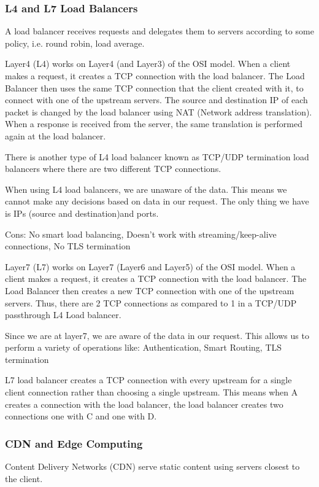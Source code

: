 \documentclass{article}
\begin{document}
    \subsubsection{L4 and L7 Load Balancers}
    A load balancer receives requests and delegates them to servers according to some policy, i.e. round robin, load average.
    
    Layer4 (L4) works on Layer4 (and Layer3) of the OSI model. When a client makes a request, it creates a TCP connection with the load balancer. The Load Balancer then uses the same TCP connection that the client created with it, to connect with one of the upstream servers. The source and destination IP of each packet is changed by the load balancer using NAT (Network address translation). When a response is received from the server, the same translation is performed again at the load balancer.
    
    There is another type of L4 load balancer known as TCP/UDP termination load balancers where there are two different TCP connections.
    
    When using L4 load balancers, we are unaware of the data. This means we cannot make any decisions based on data in our request. The only thing we have is IPs (source and destination)and ports.
    
    Cons: No smart load balancing, Doesn’t work with streaming/keep-alive connections, No TLS termination

    Layer7 (L7) works on Layer7 (Layer6 and Layer5) of the OSI model. When a client makes a request, it creates a TCP connection with the load balancer. The Load Balancer then creates a new TCP connection with one of the upstream servers. Thus, there are 2 TCP connections as compared to 1 in a TCP/UDP passthrough L4 Load balancer.
    
    Since we are at layer7, we are aware of the data in our request. This allows us to perform a variety of operations like: Authentication, Smart Routing, TLS termination
    
    L7 load balancer creates a TCP connection with every upstream for a single client connection rather than choosing a single upstream. This means when A creates a connection with the load balancer, the load balancer creates two connections one with C and one with D.
    
    \subsubsection{CDN and Edge Computing}
    Content Delivery Networks (CDN) serve static content using servers closest to the client.
    
\end{document}
